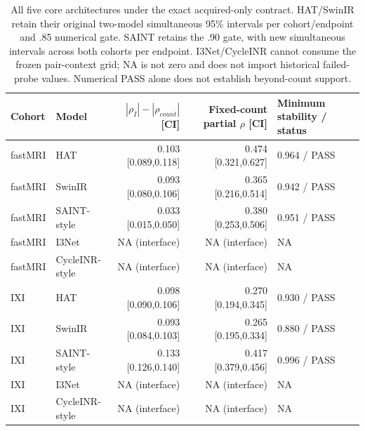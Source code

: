 \begin{table}[t]\centering\footnotesize
\caption{All five core architectures under the exact acquired-only contract. HAT/SwinIR retain their original two-model simultaneous 95\% intervals per cohort/endpoint and .85 numerical gate. SAINT retains the .90 gate, with new simultaneous intervals across both cohorts per endpoint. I3Net/CycleINR cannot consume the frozen pair-context grid; NA is not zero and does not import historical failed-probe values. Numerical PASS alone does not establish beyond-count support.}
\label{tab:acquired-core}\setlength{\tabcolsep}{4pt}
\begin{tabular}{llrrl}\toprule Cohort & Model & $|\rho_I|-|\rho_{count}|$ [CI] & Fixed-count partial $\rho$ [CI] & Minimum stability / status\\\midrule
fastMRI & HAT & 0.103 [0.089,0.118] & 0.474 [0.321,0.627] & 0.964 / PASS \\
fastMRI & SwinIR & 0.093 [0.080,0.106] & 0.365 [0.216,0.514] & 0.942 / PASS \\
fastMRI & SAINT-style & 0.033 [0.015,0.050] & 0.380 [0.253,0.506] & 0.951 / PASS \\
fastMRI & I3Net & NA (interface) & NA (interface) & NA \\
fastMRI & CycleINR-style & NA (interface) & NA (interface) & NA \\
IXI & HAT & 0.098 [0.090,0.106] & 0.270 [0.194,0.345] & 0.930 / PASS \\
IXI & SwinIR & 0.093 [0.084,0.103] & 0.265 [0.195,0.334] & 0.880 / PASS \\
IXI & SAINT-style & 0.133 [0.126,0.140] & 0.417 [0.379,0.456] & 0.996 / PASS \\
IXI & I3Net & NA (interface) & NA (interface) & NA \\
IXI & CycleINR-style & NA (interface) & NA (interface) & NA \\\bottomrule\end{tabular}\end{table}